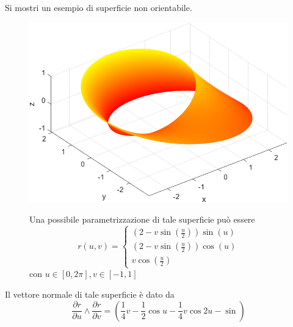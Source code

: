 \begin{example} 
    Si mostri un esempio di superficie non orientabile.
\begin{figure}[H]
     \centering
     \begin{minipage}{0.4\textwidth}
     \includegraphics[width=\textwidth]{Capitoli/Capitolo6/Nastro di Moebius.png}
     \end{minipage}
     \begin{minipage}{0.55\textwidth}
        Una possibile parametrizzazione di tale superficie può essere
        \begin{equation*}
            r(u,v)= \begin{cases}
                \left(2-v \sin\left(\frac{u}{2}\right)\right) \sin(u)\\
                \left(2-v \sin\left(\frac{u}{2}\right)\right) \cos (u)\\
                v \cos\left(\frac{u}{2}\right)
            \end{cases}
        \end{equation*}
    con $u \in [0, 2\pi], v \in [-1,1]$
     \end{minipage}
 \end{figure}
 Il vettore normale di tale superficie è dato da
 \begin{equation*}
     \frac{\partial r}{\partial u} \wedge \frac{\partial r}{\partial v} = \left( \frac{1}{4}v- \frac{1}{2} \cos u - \frac{1}{4} v \cos 2u - \sin \right)
 \end{equation*}
 \begin{figure}[H]
     \centering
     \begin{minipage}{0.5\textwidth}

\end{minipage}
\end{figure}
\end{example}
